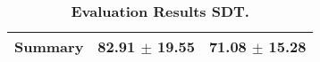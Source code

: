 \begin{table}[htb]
{\begin{tabular}{lll}
\midrule
\textbf{Summary                                  } &                  \phantom{0}82.91 $\pm$ 19.55 &                      \phantom{0}71.08 $\pm$ 15.28 \\
\bottomrule
\end{tabular}%
}
\caption{\textbf{Evaluation Results SDT.}}
\label{tab:eval-results}
\end{table}

